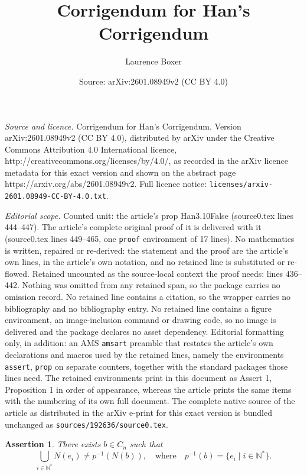 \documentclass[10pt,a4paper]{amsart}
\title{Corrigendum for Han's Corrigendum}
\author{Laurence Boxer}
\date{Source: arXiv:2601.08949v2 (CC BY 4.0)}
\newtheorem{assert}{Assertion}
\def\N{{\mathbb N}}
\begin{document}
\maketitle

\noindent\emph{Source and licence.} Corrigendum for Han's Corrigendum. Version arXiv:2601.08949v2 (CC BY 4.0), distributed by arXiv under the Creative Commons Attribution 4.0 International licence, http://creativecommons.org/licenses/by/4.0/, as recorded in the arXiv licence metadata for this exact version and shown on the abstract page https://arxiv.org/abs/2601.08949v2. Full licence notice: \texttt{licenses/arxiv-2601.08949-CC-BY-4.0.txt}.\par\smallskip

\noindent\textit{Editorial scope.} Counted unit: the article's prop Han3.10False (source0.tex lines 444--447). The article's complete original proof of it is delivered with it (source0.tex lines 449--465, one \texttt{proof} environment of 17 lines). No mathematics is written, repaired or re-derived: the statement and the proof are the article's own lines, in the article's own notation, and no retained line is substituted or re-flowed.  Retained uncounted as the source-local context the proof needs: lines 436--442.  Nothing was omitted from any retained span, so the package carries no omission record.  No retained line contains a citation, so the wrapper carries no bibliography and no bibliography entry.  No retained line contains a figure environment, an image-inclusion command or drawing code, so no image is delivered and the package declares no asset dependency.  Editorial formatting only, in addition: an AMS \texttt{amsart} preamble that restates the article's own declarations and macros used by the retained lines, namely the environments \texttt{assert}, \texttt{prop} on separate counters, together with the standard packages those lines need.  The retained environments print in this document as Assert 1, Proposition 1 in order of appearance, whereas the article prints the same items with the numbering of its own full document.  The complete native source of the article as distributed in the arXiv e-print for this exact version is bundled unchanged as \texttt{sources/192636/source0.tex}.
\begin{assert}
    \label{Han3.10-1}
    There exists $b \in C_n$ such that
    \[ \bigcup_{i \in \N^*} N(e_i) \neq p^{-1}(N(b)), ~~~ \mbox{ where } ~~~
       p^{-1}(b) = \{ e_i \mid i \in \N^* \}.
    \]
\end{assert}
\end{document}

